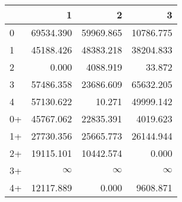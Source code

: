 \begin{tabular}{lrrr}
\toprule
     &         1 &         2 &         3 \\
\midrule
 0   & \num{69534.390} & \num{59969.865} & \num{10786.775} \\
 1   & \num{45188.426} & \num{48383.218} & \num{38204.833} \\
 2   &     \num{0.000} &  \num{4088.919} &    \num{33.872} \\
 3   & \num{57486.358} & \num{23686.609} & \num{65632.205} \\
 4   & \num{57130.622} &    \num{10.271} & \num{49999.142} \\
 0+  & \num{45767.062} & \num{22835.391} &  \num{4019.623} \\
 1+  & \num{27730.356} & \num{25665.773} & \num{26144.944} \\
 2+  & \num{19115.101} & \num{10442.574} &     \num{0.000} \\
 3+  &  $\infty$    &  $\infty$    &  $\infty$    \\
 4+  & \num{12117.889} &     \num{0.000} &  \num{9608.871} \\
\bottomrule
\end{tabular}
